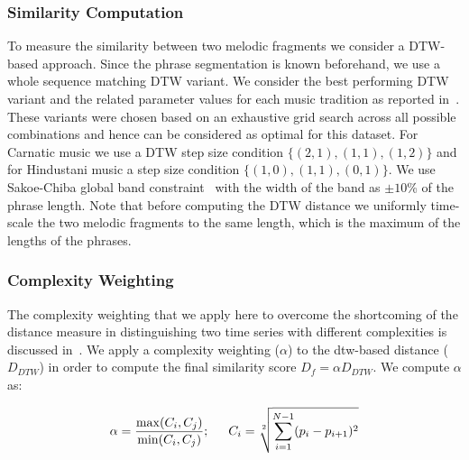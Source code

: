 \subsubsection{Similarity Computation}
\label{sec:patterns_improving_similarity_similarity_computation}

To measure the similarity between two melodic fragments we consider a DTW-based approach. Since the phrase segmentation is known beforehand, we use a whole sequence matching DTW variant. We consider the best performing DTW variant and the related parameter values for each music tradition as reported in~\cite{gulati_ICASSP2015}. These variants were chosen based on an exhaustive grid search across all possible combinations and hence can be considered as optimal for this dataset. For Carnatic music we use a DTW step size condition $\lbrace(2,1), (1,1), (1,2)\rbrace$  and for Hindustani music a step size condition $\lbrace(1,0), (1,1), (0,1)\rbrace$.  We use Sakoe-Chiba global band constraint~\cite{Sakoe78TASLP} with the width of the band as $\pm10$\% of the phrase length. Note that before computing the DTW distance we uniformly time-scale the two melodic fragments to the same length, which is the maximum of the lengths of the phrases.


\subsubsection{Complexity Weighting}
\label{sec:patterns_improving_similarity_complexity_invariance_weighting}

The complexity weighting that we apply here to overcome the shortcoming of the distance measure in distinguishing two time series with different complexities is discussed in~\cite{batista2011complexity}. We apply a complexity weighting ($\alpha$) to the \gls{dtw}-based distance ($D_{DTW}$) in order to compute the final similarity score $D_{f}=\alpha D_{DTW}$. We compute $\alpha$ as:


\begin{equation}
\begin{gathered}
\alpha = \frac{\max(C_i,C_j)}{\min(C_i, C_j)};\hspace{1.5em} C_i = \sqrt[2]{\sum_{i=1}^{N-1} (p_{i}-p_{i+1})^2}\\
\end{gathered}
\label{complexity_estimate_batista}
\end{equation}

